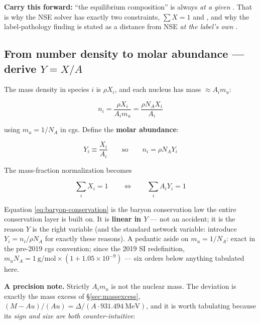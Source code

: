 \textbf{Carry this forward:} ``the equilibrium composition'' is always \emph{at
a given \Ye{}}. That is why the NSE solver has exactly two constraints,
$\sum X = 1$ and \Ye{}, and why the label-pathology finding is stated as a
distance from NSE \emph{at the label's own \Ye{}}.

\subsection{From number density to molar abundance --- derive
  \texorpdfstring{$Y = X/A$}{Y = X/A}}
\label{sec:molarabundance}

The mass density in species $i$ is $\rho X_i$, and each nucleus has mass
$\approx A_i m_u$:

\begin{equation*}
n_i = \frac{\rho X_i}{A_i m_u} = \frac{\rho N_A X_i}{A_i}
\end{equation*}

using $m_u = 1/N_A$ in cgs. Define the \textbf{molar abundance}:

\begin{equation}
Y_i \equiv \frac{X_i}{A_i} \qquad \text{so} \qquad n_i = \rho N_A Y_i
\label{eq:molar-abundance}
\end{equation}

The mass-fraction normalization becomes

\begin{equation}
\sum_i X_i = 1 \qquad \iff \qquad \sum_i A_i Y_i = 1
\label{eq:baryon-conservation}
\end{equation}

Equation \eqref{eq:baryon-conservation} is the baryon conservation law the
entire conservation layer is built on. It is \textbf{linear in $Y$} --- not an
accident; it is the reason $Y$ is the right variable (and the standard network
variable: \citealt{hix1999b} introduce $Y_i = n_i/\rho N_A$ for exactly these
reasons). A pedantic aside on $m_u = 1/N_A$: exact in the pre-2019 cgs
convention; since the 2019 SI redefinition,
$m_u N_A = 1~\mathrm{g/mol} \times (1 + 1.05\times10^{-9})$
\citep{codata2022} --- six orders below anything tabulated here.

\textbf{A precision note.} Strictly $A_i m_u$ is not the nuclear mass. The
deviation is exactly the mass excess of \S\ref{sec:massexcess},
$(M - A u)/(A u) = \Delta/(A \cdot 931.494~\mathrm{MeV})$, and it is worth
tabulating because its \emph{sign and size are both counter-intuitive}:

